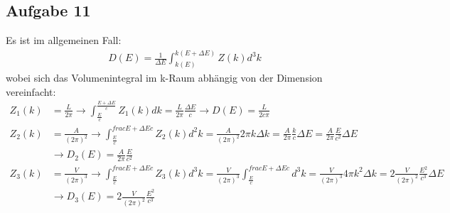 \subsection*{Aufgabe 11}
Es ist im allgemeinen Fall:
\begin{align*}
D(E)=\frac{1}{\Delta E}\int_{k(E)}^{k(E+\Delta E)} Z(k) d^3k\end{align*} 
wobei sich das Volumenintegral im k-Raum abhängig von der Dimension vereinfacht:
\begin{align*}
Z_1(k) &= \frac{L}{2\pi} \rightarrow \int_{\frac{E}{c}}^{\frac{E+\Delta E}{c}} Z_1(k) dk = \frac{L}{2\pi} \frac{\Delta E}{c} \rightarrow D(E)=\frac{L}{2c\pi}\\
Z_2(k) &= \frac{A}{(2\pi)^2} \rightarrow \int_{\frac{E}{c}}^{frac{E+\Delta E}{c}} Z_2(k) d^2k = \frac{A}{(2\pi)^2} 2\pi k \Delta k =\frac{A}{2\pi} \frac{k}{c} \Delta E = \frac{A}{2\pi}\frac{E}{c^2} \Delta E \\
&\rightarrow D_2(E) = \frac{A}{2\pi}\frac{E}{c^2}\\
Z_3(k) &= \frac{V}{(2\pi)^3} \rightarrow \int_{\frac{E}{c}}^{frac{E+\Delta E}{c}} Z_3(k) d^3k = \frac{V}{(2\pi)^3}\int_{\frac{E}{c}}^{frac{E+\Delta E}{c}} d^3k = \frac{V}{(2\pi)^3}4\pi k^2 \Delta k = 2\frac{V}{(2\pi)^2} \frac{E^2}{c^3} \Delta E\\
&\rightarrow D_3(E) = 2\frac{V}{(2\pi)^2} \frac{E^2}{c^3}
\end{align*}